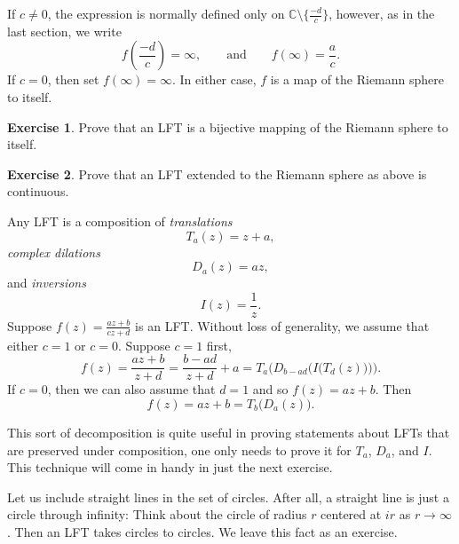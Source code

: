 \documentclass[12pt,openany]{book}
\newcommand{\C}{{\mathbb{C}}}
\theoremstyle{plain}
\theoremstyle{remark}
\theoremstyle{definition}
\newenvironment{exbox}{%
    \def\FrameCommand{\vrule width 1pt \relax\hspace {10pt}}%
    \MakeFramed {\advance \hsize -\width \FrameRestore }%
}{%
    \endMakeFramed
}
\theoremstyle{exercise}
\newtheorem{exercise}{Exercise}[section]
\theoremstyle{example}
\begin{document}
If $c\not=0$,
the expression is normally defined only on
$\C \setminus \bigl\{ \frac{-d}{c} \bigr\}$,
however, as in the last section, we write
\begin{equation*}
f\left(\frac{-d}{c}\right) = \infty, \qquad \text{and} \qquad
f(\infty) = \frac{a}{c} .
\end{equation*}
If $c=0$, then set $f(\infty) = \infty$.  In either case, $f$ is a map of
the Riemann sphere to itself.

\begin{exbox}
\begin{exercise}
Prove that an LFT is a bijective mapping of the Riemann sphere to itself.
\end{exercise}

\begin{exercise}
Prove that an LFT extended to the Riemann sphere as above is continuous.
\end{exercise}
\end{exbox}

Any LFT is a composition of \emph{translations}
\begin{equation*}
T_a(z) = z + a ,
\end{equation*}
\emph{complex dilations}
\begin{equation*}
D_a(z) = az ,
\end{equation*}
and \emph{inversions}
\begin{equation*}
I(z) = \frac{1}{z}.
\end{equation*}
Suppose $f(z) = \frac{az+b}{cz+d}$ is an LFT.
Without loss of generality, we assume that either $c=1$ or $c=0$.
Suppose $c=1$ first,
\begin{equation*}
f(z)
=
\frac{a z + b}{z + d}
=
\frac{b-ad}{z+d}+a
=
T_a\biggr(D_{b-ad}\Bigr(I\bigl(T_d(z)\bigr)\Bigr)\biggr) .
\end{equation*}
If $c=0$, then we can also assume that $d=1$ and
so $f(z) = az + b$.
Then
\begin{equation*}
f(z) = az+b = T_b\bigl(D_a(z)\bigr) .
\end{equation*}

This sort of decomposition is quite useful in proving statements about
LFTs that are preserved under composition,
one only needs to prove it for $T_a$, $D_a$, and $I$.  This technique
will come in handy in just the next exercise.

Let us include straight lines in the set of circles.  After all, a straight
line is just a circle through infinity: Think about the circle of radius $r$
centered at $ir$ as $r \to \infty$.  Then an LFT takes circles to circles.
We leave this fact as an exercise.
\end{document}
